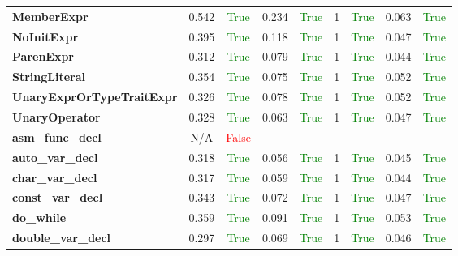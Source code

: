 \documentclass{article}
\begin{document}
\begin{xltabular}{\textwidth}{lcccccccc}
\textbf{{\fontsize{10}{12}\selectfont MemberExpr}}& 0.542&\textcolor{green}{True}& 0.234&\textcolor{green}{True}& 1&\textcolor{green}{True}& 0.063&\textcolor{green}{True} \\[0.5ex]
\textbf{{\fontsize{10}{12}\selectfont NoInitExpr}}& 0.395&\textcolor{green}{True}& 0.118&\textcolor{green}{True}& 1&\textcolor{green}{True}& 0.047&\textcolor{green}{True} \\[0.5ex]
\textbf{{\fontsize{10}{12}\selectfont ParenExpr}}& 0.312&\textcolor{green}{True}& 0.079&\textcolor{green}{True}& 1&\textcolor{green}{True}& 0.044&\textcolor{green}{True} \\[0.5ex]
\textbf{{\fontsize{10}{12}\selectfont StringLiteral}}& 0.354&\textcolor{green}{True}& 0.075&\textcolor{green}{True}& 1&\textcolor{green}{True}& 0.052&\textcolor{green}{True} \\[0.5ex]
\textbf{{\fontsize{10}{12}\selectfont UnaryExprOrTypeTraitExpr}}& 0.326&\textcolor{green}{True}& 0.078&\textcolor{green}{True}& 1&\textcolor{green}{True}& 0.052&\textcolor{green}{True} \\[0.5ex]
\textbf{{\fontsize{10}{12}\selectfont UnaryOperator}}& 0.328&\textcolor{green}{True}& 0.063&\textcolor{green}{True}& 1&\textcolor{green}{True}& 0.047&\textcolor{green}{True} \\[0.5ex]
\textbf{{\fontsize{10}{12}\selectfont asm\_func\_decl}}& N/A&\textcolor{red}{False} \\[0.5ex]
\textbf{{\fontsize{10}{12}\selectfont auto\_var\_decl}}& 0.318&\textcolor{green}{True}& 0.056&\textcolor{green}{True}& 1&\textcolor{green}{True}& 0.045&\textcolor{green}{True} \\[0.5ex]
\textbf{{\fontsize{10}{12}\selectfont char\_var\_decl}}& 0.317&\textcolor{green}{True}& 0.059&\textcolor{green}{True}& 1&\textcolor{green}{True}& 0.044&\textcolor{green}{True} \\[0.5ex]
\textbf{{\fontsize{10}{12}\selectfont const\_var\_decl}}& 0.343&\textcolor{green}{True}& 0.072&\textcolor{green}{True}& 1&\textcolor{green}{True}& 0.047&\textcolor{green}{True} \\[0.5ex]
\textbf{{\fontsize{10}{12}\selectfont do\_while}}& 0.359&\textcolor{green}{True}& 0.091&\textcolor{green}{True}& 1&\textcolor{green}{True}& 0.053&\textcolor{green}{True} \\[0.5ex]
\textbf{{\fontsize{10}{12}\selectfont double\_var\_decl}}& 0.297&\textcolor{green}{True}& 0.069&\textcolor{green}{True}& 1&\textcolor{green}{True}& 0.046&\textcolor{green}{True} \\[0.5ex]

\end{xltabular}
\end{document}
